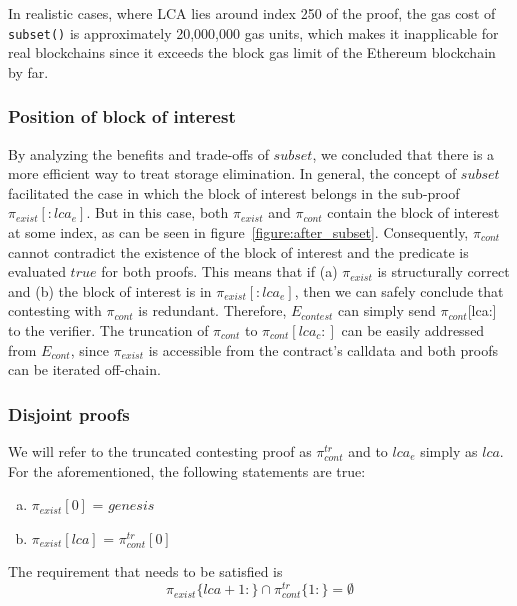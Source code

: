 In realistic cases, where LCA lies around index 250 of the proof, the gas cost
of \texttt{subset()} is approximately 20,000,000 gas units, which makes it
inapplicable for real blockchains since it exceeds the block gas limit of the
Ethereum blockchain by far.

\subsubsection{Position of block of interest}

By analyzing the benefits and trade-offs of $subset$, we concluded that there
is a more efficient way to treat storage elimination. In general, the concept
of $subset$ facilitated the case in which the block of interest belongs in the
sub-proof $\pi_{exist}[:lca_{e}]$. But in this case, both $\pi_{exist}$ and
$\pi_{cont}$ contain the block of interest at some index, as can be seen in
figure~\ref{figure:after_subset}. Consequently, $\pi_{cont}$ cannot contradict
the existence of the block of interest and the predicate is evaluated $true$
for both proofs. This means that if (a) $\pi_{exist}$ is structurally correct
and (b) the block of interest is in $\pi_{exist}[:lca_{e}]$, then we can safely
conclude that contesting with $\pi_{cont}$ is redundant. Therefore,
$E_{contest}$ can simply send $\pi_{cont}$[lca:] to the verifier. The
truncation of $\pi_{cont}$ to $\pi_{cont}[lca_{c}:]$ can be easily addressed
from $E_{cont}$, since $\pi_{exist}$ is accessible from the contract's
calldata and both proofs can be iterated off-chain.

\newcommand*{\exist}{$\pi_{exist}$}
\newcommand*{\cont}{$\pi_{cont}^{tr}$}

\subsubsection{Disjoint proofs}

We will refer to the truncated contesting proof as $\pi_{cont}^{tr}$ and to
$lca_{e}$ simply as $lca$. For the aforementioned, the following statements are
true:

\begin{enumerate}[(a)]
    \item  $\pi_{exist}[0]$ = $genesis$
    \item  $\pi_{exist}[lca]$ = $\pi_{cont}^{tr}[0]$
\end{enumerate}

The requirement that needs to be satisfied is
\[\pi_{exist}\{lca+1:\} \cap \pi_{cont}^{tr}\{1:\} = \emptyset \]

